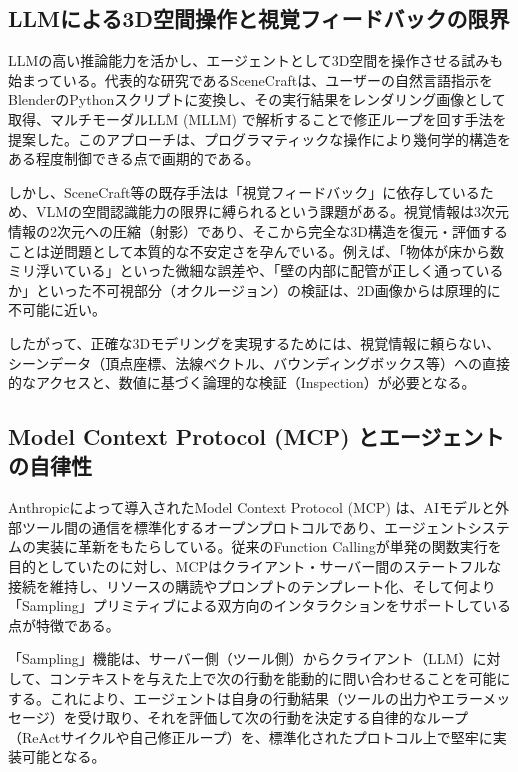 \documentclass{deimj}
\begin{document}
\subsection{LLMによる3D空間操作と視覚フィードバックの限界}

LLMの高い推論能力を活かし、エージェントとして3D空間を操作させる試みも始まっている。代表的な研究であるSceneCraft\cite{hu2024scenecraft}は、ユーザーの自然言語指示をBlenderのPythonスクリプトに変換し、その実行結果をレンダリング画像として取得、マルチモーダルLLM (MLLM) で解析することで修正ループを回す手法を提案した。このアプローチは、プログラマティックな操作により幾何学的構造をある程度制御できる点で画期的である。

しかし、SceneCraft等の既存手法は「視覚フィードバック」に依存しているため、VLMの空間認識能力の限界に縛られるという課題がある。視覚情報は3次元情報の2次元への圧縮（射影）であり、そこから完全な3D構造を復元・評価することは逆問題として本質的な不安定さを孕んでいる。例えば、「物体が床から数ミリ浮いている」といった微細な誤差や、「壁の内部に配管が正しく通っているか」といった不可視部分（オクルージョン）の検証は、2D画像からは原理的に不可能に近い。

したがって、正確な3Dモデリングを実現するためには、視覚情報に頼らない、シーンデータ（頂点座標、法線ベクトル、バウンディングボックス等）への直接的なアクセスと、数値に基づく論理的な検証（Inspection）が必要となる。

\subsection{Model Context Protocol (MCP) とエージェントの自律性}

Anthropicによって導入されたModel Context Protocol (MCP)\cite{anthropic2024mcp} は、AIモデルと外部ツール間の通信を標準化するオープンプロトコルであり、エージェントシステムの実装に革新をもたらしている。従来のFunction Callingが単発の関数実行を目的としていたのに対し\cite{schick2024toolformer}、MCPはクライアント・サーバー間のステートフルな接続を維持し、リソースの購読やプロンプトのテンプレート化、そして何より「Sampling」プリミティブによる双方向のインタラクションをサポートしている点が特徴である。

「Sampling」機能は、サーバー側（ツール側）からクライアント（LLM）に対して、コンテキストを与えた上で次の行動を能動的に問い合わせることを可能にする。これにより、エージェントは自身の行動結果（ツールの出力やエラーメッセージ）を受け取り、それを評価して次の行動を決定する自律的なループ（ReActサイクル\cite{yao2023react}や自己修正ループ\cite{shinn2024reflexion,xi2023rise}）を、標準化されたプロトコル上で堅牢に実装可能となる。
\end{document}
